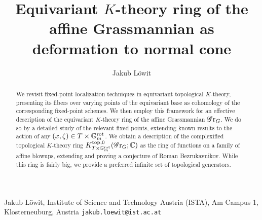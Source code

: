 

\usepackage[style=alphabetic, maxnames = 5, maxalphanames=5]{biblatex}


\title{Equivariant $K$-theory ring of the affine Grassmannian as deformation to normal cone}
\author{Jakub Löwit}
\date{}



\maketitle

\begin{abstract}
We revisit fixed-point localization techniques in equivariant topological $K$-theory, presenting its fibers over varying points of the equivariant base as cohomology of the corresponding fixed-point schemes. We then employ this framework for an effective description of the equivariant $K$-theory ring of the affine Grassmannian $\operatorname{\mathscr{G}r}_G$. We do so by a detailed study of the relevant fixed points, extending known results to the action of any $(x, \zeta) \in T \times \mathbb{G}_m^{\mathrm{rot}}$. We obtain a description of the complexified topological $K$-theory ring $K^{\mathrm{top}, 0}_{T\times \mathbb{G}_m^{\mathrm{rot}}}(\operatorname{\mathscr{G}r}_G; \operatorname{\mathbb{C}})$ as the ring of functions on a family of affine blowups, extending and proving a conjecture of Roman Bezrukavnikov. While this ring is fairly big, we provide a preferred infinite set of topological generators. 
\end{abstract}

\tableofcontents








\appendix


\printbibliography

\bigskip
\noindent Jakub Löwit, \newline
Institute of Science and Technology Austria (ISTA), \newline
Am Campus 1,  Klosterneuburg, \newline
Austria \newline
\texttt{jakub.loewit@ist.ac.at}



